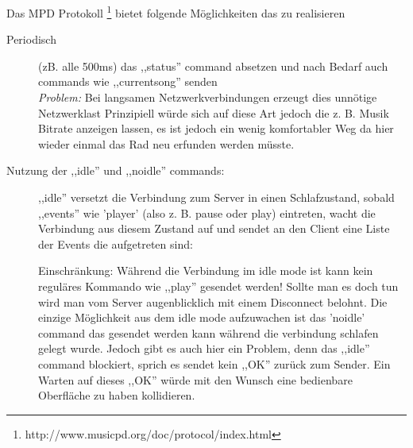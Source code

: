 Das MPD Protokoll \footnote{http://www.musicpd.org/doc/protocol/index.html} bietet folgende Möglichkeiten das zu realisieren
\begin{description}
    \item [Periodisch] (zB. alle 500ms) das ,,status'' command absetzen und nach Bedarf auch commands wie ,,currentsong''
        senden
        \\
        \emph{Problem:} Bei langsamen Netzwerkverbindungen erzeugt dies unnötige Netzwerklast 
        Prinzipiell würde sich auf diese Art jedoch die z. B. Musik Bitrate anzeigen lassen, es ist jedoch ein
        wenig komfortabler Weg da hier wieder einmal das Rad neu erfunden werden müsste.
    \item [Nutzung der ,,idle'' und ,,noidle'' commands:]
        ,,idle'' versetzt die Verbindung zum Server in einen Schlafzustand, sobald ,,events'' wie 'player' (also z. B. pause oder play) 
        eintreten, wacht die Verbindung aus diesem Zustand auf und sendet an den Client eine Liste der Events die aufgetreten sind:



        Einschränkung: Während die Verbindung im idle mode ist kann kein reguläres Kommando wie ,,play'' gesendet werden!
        Sollte man es doch tun wird man vom Server augenblicklich mit einem Disconnect belohnt.
        Die einzige Möglichkeit aus dem idle mode aufzuwachen ist das 'noidle' command das gesendet werden
        kann während die verbindung schlafen gelegt wurde.
        Jedoch gibt es auch hier ein Problem, denn das ,,idle'' command blockiert, sprich es sendet kein ,,OK'' zurück zum Sender.
        Ein Warten auf dieses ,,OK'' würde mit den Wunsch eine bedienbare Oberfläche zu haben kollidieren.
\end{description}

